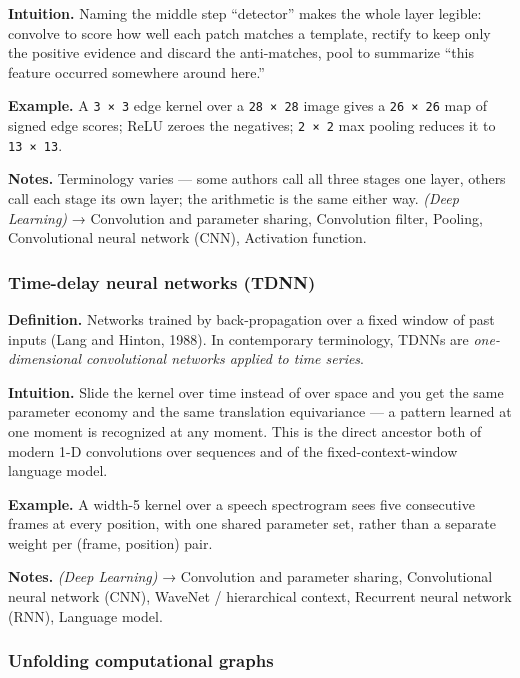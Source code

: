 \documentclass[
  10pt,
  letterpaper,
  onecolumn]{article}
\begin{document}
\textbf{Intuition.} Naming the middle step ``detector'' makes the whole
layer legible: convolve to score how well each patch matches a template,
rectify to keep only the positive evidence and discard the anti-matches,
pool to summarize ``this feature occurred somewhere around here.''

\textbf{Example.} A \texttt{3\ ×\ 3} edge kernel over a
\texttt{28\ ×\ 28} image gives a \texttt{26\ ×\ 26} map of signed edge
scores; ReLU zeroes the negatives; \texttt{2\ ×\ 2} max pooling reduces
it to \texttt{13\ ×\ 13}.

\textbf{Notes.} Terminology varies --- some authors call all three
stages one layer, others call each stage its own layer; the arithmetic
is the same either way. \emph{(Deep Learning)} → Convolution and
parameter sharing, Convolution filter, Pooling, Convolutional neural
network (CNN), Activation function.

\hypertarget{time-delay-neural-networks-tdnn}{%
\subsubsection{Time-delay neural networks
(TDNN)}\label{time-delay-neural-networks-tdnn}}

\textbf{Definition.} Networks trained by back-propagation over a fixed
window of past inputs (Lang and Hinton, 1988). In contemporary
terminology, TDNNs are \emph{one-dimensional convolutional networks
applied to time series}.

\textbf{Intuition.} Slide the kernel over time instead of over space and
you get the same parameter economy and the same translation equivariance
--- a pattern learned at one moment is recognized at any moment. This is
the direct ancestor both of modern 1-D convolutions over sequences and
of the fixed-context-window language model.

\textbf{Example.} A width-5 kernel over a speech spectrogram sees five
consecutive frames at every position, with one shared parameter set,
rather than a separate weight per (frame, position) pair.

\textbf{Notes.} \emph{(Deep Learning)} → Convolution and parameter
sharing, Convolutional neural network (CNN), WaveNet / hierarchical
context, Recurrent neural network (RNN), Language model.

\hypertarget{unfolding-computational-graphs}{%
\subsubsection{Unfolding computational
graphs}\label{unfolding-computational-graphs}}
\end{document}
